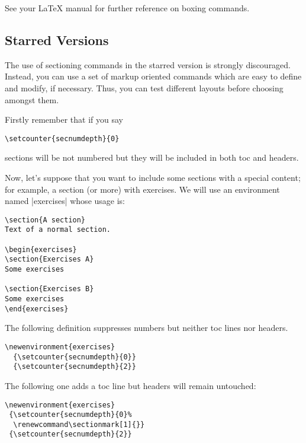 \documentclass[a4paper]{ltxguide}
\begin{document}
See your \LaTeX{} manual for further reference on boxing commands.

\subsection{Starred Versions}
\label{s:starred}

The use of sectioning commands in the starred version is strongly 
discouraged.  Instead, you can use a set of markup oriented commands 
which are easy to define and modify, if necessary.  Thus, you can test 
different layouts before choosing amongst them.

Firstly remember that if you say
\begin{verbatim}
\setcounter{secnumdepth}{0}
\end{verbatim}
sections will be not numbered but they will be included in both toc
and headers.

Now, let's
suppose that you want to include some sections with a special content;
for example, a section (or more) with exercises. We will use an
environment named |exercises| whose usage is:
\begin{verbatim}
\section{A section}
Text of a normal section.

\begin{exercises}
\section{Exercises A}
Some exercises

\section{Exercises B}
Some exercises
\end{exercises}
\end{verbatim}

The following definition suppresses numbers but neither toc lines
nor headers.
\begin{verbatim}
\newenvironment{exercises}
  {\setcounter{secnumdepth}{0}}
  {\setcounter{secnumdepth}{2}}
\end{verbatim}

The following one adds a toc line but headers will remain
untouched:
\begin{verbatim}
\newenvironment{exercises}
 {\setcounter{secnumdepth}{0}%
  \renewcommand\sectionmark[1]{}}
 {\setcounter{secnumdepth}{2}}
\end{verbatim}
\end{document}
